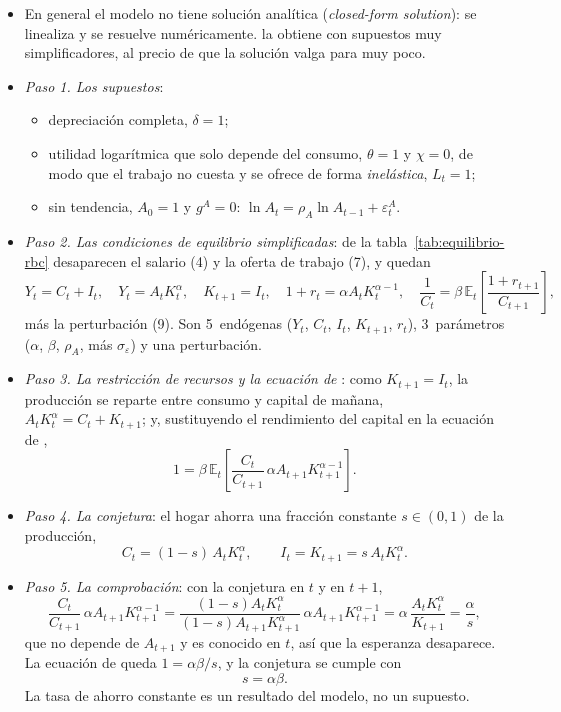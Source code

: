 \documentclass[11pt]{article}
\begin{document}
\begin{itemize}
\item En general el modelo no tiene solución analítica (\emph{closed-form solution}): se linealiza y se resuelve numéricamente. \textcite{McCallum1989Real} la obtiene con supuestos muy simplificadores, al precio de que la solución valga para muy poco.
\item \emph{Paso 1. Los supuestos}:
  \begin{itemize}
  \item depreciación completa, $\delta=1$;
  \item utilidad logarítmica que solo depende del consumo, $\theta=1$ y $\chi=0$, de modo que el trabajo no cuesta y se ofrece de forma \emph{inelástica}, $L_t=1$;
  \item sin tendencia, $A_0=1$ y $g^A=0$: $\ln A_t=\rho_A\ln A_{t-1}+\varepsilon^A_t$.
  \end{itemize}
\item \emph{Paso 2. Las condiciones de equilibrio simplificadas}: de la tabla~\ref{tab:equilibrio-rbc} desaparecen el salario (4) y la oferta de trabajo (7), y quedan
  \begin{equation*}
  Y_t=C_t+I_t,\quad Y_t=A_tK_t^{\alpha},\quad K_{t+1}=I_t,\quad 1+r_t=\alpha A_tK_t^{\alpha-1},\quad \frac{1}{C_t}=\beta\,\mathbb{E}_t\!\left[\frac{1+r_{t+1}}{C_{t+1}}\right],
  \end{equation*}
  más la perturbación (9). Son 5~endógenas ($Y_t$, $C_t$, $I_t$, $K_{t+1}$, $r_t$), 3~parámetros ($\alpha$, $\beta$, $\rho_A$, más $\sigma_\varepsilon$) y una perturbación.
\item \emph{Paso 3. La restricción de recursos y la ecuación de }: como $K_{t+1}=I_t$, la producción se reparte entre consumo y capital de mañana, $A_tK_t^{\alpha}=C_t+K_{t+1}$; y, sustituyendo el rendimiento del capital en la ecuación de ,
  \begin{equation*}
  1=\beta\,\mathbb{E}_t\!\left[\frac{C_t}{C_{t+1}}\,\alpha A_{t+1}K_{t+1}^{\alpha-1}\right].
  \end{equation*}
\item \emph{Paso 4. La conjetura}: el hogar ahorra una fracción constante $s\in(0,1)$ de la producción,
  \begin{equation*}
  C_t=(1-s)\,A_tK_t^{\alpha},\qquad I_t=K_{t+1}=s\,A_tK_t^{\alpha}.
  \end{equation*}
\item \emph{Paso 5. La comprobación}: con la conjetura en $t$ y en $t+1$,
  \begin{equation*}
  \frac{C_t}{C_{t+1}}\,\alpha A_{t+1}K_{t+1}^{\alpha-1}=\frac{(1-s)A_tK_t^{\alpha}}{(1-s)A_{t+1}K_{t+1}^{\alpha}}\,\alpha A_{t+1}K_{t+1}^{\alpha-1}=\alpha\,\frac{A_tK_t^{\alpha}}{K_{t+1}}=\frac{\alpha}{s},
  \end{equation*}
  que no depende de $A_{t+1}$ y es conocido en $t$, así que la esperanza desaparece. La ecuación de  queda $1=\alpha\beta/s$, y la conjetura se cumple con
  \begin{equation*}
  s=\alpha\beta .
  \end{equation*}
  La tasa de ahorro constante es un resultado del modelo, no un supuesto.
\end{itemize}
\findemo
\end{document}

